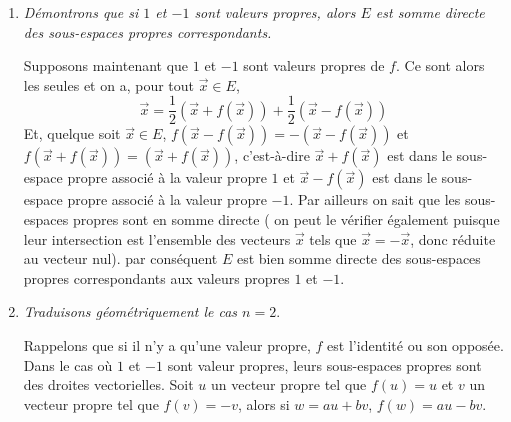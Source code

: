 {{\begin {enumerate}
{\it Nous allons en d\'eduire que $f$ admet toujours une valeur propre.}

Supposons que $1$ ne soit pas valeur propre de $f$, alors, $\vec x=f(\vec x)\Rightarrow \vec x=\vec 0$. Or, pour tout $\vec x\in E$, on a
$f(\vec x+f(\vec x))=f(\vec x)+\vec x$, donc pour tout $\vec x\in E$, on a $f(\vec x)+\vec x=\vec 0$, c'est-\`a-dire, $f(\vec x)=-\vec x$.
Ce qui prouve que $-1$ est valeur propre de $f$. On a m\^eme dans ce cas $f=-{\rm mathrm{Id}_E}$. 

Si $-1$ n'est pas valeur propre de $f$, on montre par un raisonnement
analogue que pour tout $\vec x\in E$ on a $f(\vec x)-\vec x=\vec 0$. Ce qui prouve que $1$ est valeur propre de $f$, et dans ce cas $f={\rm mathrm{Id}_E}$.

  \item  {\it D\'emontrons que si $1$ et $-1$ sont valeurs propres, alors $E$ est somme directe des sous-espaces propres correspondants.}

Supposons maintenant que $1$ et $-1$ sont valeurs propres de $f$. Ce sont alors les seules et on a, pour tout $\vec x\in E$,
$$\vec x={\frac{1}{2}}(\vec x+f(\vec x))+{\frac{1}{2}}(\vec x-f(\vec x))$$
Et, quelque soit $\vec x\in E$, $f(\vec x-f(\vec x))=-(\vec x-f(\vec x))$ et $f(\vec x+f(\vec x))=(\vec x+f(\vec x))$, c'est-\`a-dire 
$\vec x+f(\vec x)$ est dans le sous-espace propre associ\'e \`a la valeur propre $1$ et $\vec x-f(\vec x)$ est dans le sous-espace propre associ\'e \`a
la valeur propre $-1$. Par ailleurs on sait que les sous-espaces propres sont en somme directe ( on peut le v\'erifier \'egalement puisque leur intersection
est l'ensemble des vecteurs $\vec x$ tels que $\vec x=-\vec x$, donc r\'eduite au vecteur nul). par cons\'equent $E$ est bien somme directe des sous-espaces
propres correspondants aux valeurs propres $1$ et $-1$.

  \item {\it Traduisons g\'eom\'etriquement le cas $n=2$}.

Rappelons que si il n'y a qu'une valeur propre, $f$ est l'identit\'e ou son oppos\'ee. Dans le cas o\`u $1$ et $-1$ sont valeur propres, leurs sous-espaces
propres sont des droites vectorielles. Soit $u$ un vecteur
propre tel que $f(u)=u$ et $v$ un vecteur propre tel que $f(v)=-v$, alors si $w=au+bv$, $f(w)=au-bv$.
\end {enumerate}
}
}
